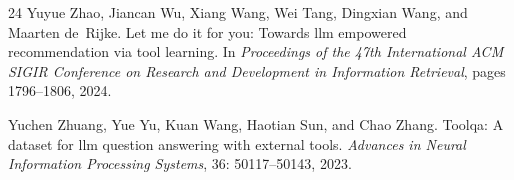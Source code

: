 \begin{thebibliography}{24}
Yuyue Zhao, Jiancan Wu, Xiang Wang, Wei Tang, Dingxian Wang, and Maarten de~Rijke.
\newblock Let me do it for you: Towards llm empowered recommendation via tool learning.
\newblock In \emph{Proceedings of the 47th International ACM SIGIR Conference on Research and Development in Information Retrieval}, pages 1796--1806, 2024.

Yuchen Zhuang, Yue Yu, Kuan Wang, Haotian Sun, and Chao Zhang.
\newblock Toolqa: A dataset for llm question answering with external tools.
\newblock \emph{Advances in Neural Information Processing Systems}, 36: 50117--50143, 2023.

\end{thebibliography}
